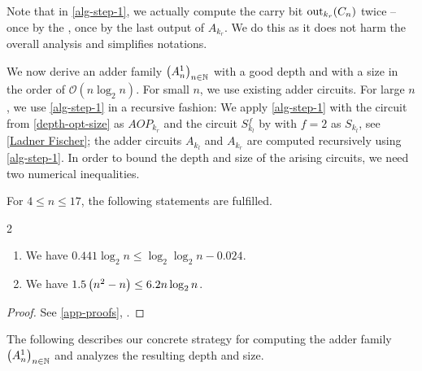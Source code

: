 Note that in \cref{alg-step-1},
we actually compute the carry bit $\operatorname{out}_{k_r}(C_n)$ twice --
once by the \aop{}, once by the last output of $A_{k_r}$.
We do this as it does not harm the overall analysis and simplifies notations.

We now derive an adder family $\left({A^{1}_n}\right)_{n \in \mathbb N}$ with a good depth and
with a size in the order of $\mathcal O(n \log_2 n)$.
For small $n$, we use existing adder circuits.
For large $n$, we use \cref{alg-step-1} in a recursive fashion:
We apply \cref{alg-step-1} with the \aop{} circuit from \cref{depth-opt-size}
as $AOP_{k_r}$ and the circuit $S\!^f_{k_l}$ by \citet{LF80} with $f = 2$
as $S\!_{k_l}$,
see \cref{Ladner Fischer};
the adder circuits $A_{k_l}$ and $A_{k_r}$ are computed recursively
using \cref{alg-step-1}.
In order to bound the depth and size of the arising circuits,
we need two numerical inequalities.
\parbox{\textwidth}{
\begin{lemma} \label{step1-num}
For $4 \leq n \leq 17$, the following statements are fulfilled.
\begin{multicols}{2}
\begin{enumerate}
\item We have $0.441 \log_2 n \leq \log_2 \log_2 n - 0.024$. \label{num-441}
\item We have $1.5 \left({n^2 - n}\right) \leq 6.2 n \log_2 n$. \label{num-sq}
\end{enumerate}
\end{multicols}
\end{lemma}
}
\begin{proof}
See \cref{app-proofs}, .
\end{proof}


The following  describes our concrete strategy
for computing the adder family $\left({A^1_n}\right)_{n \in \mathbb N}$ and
analyzes the resulting depth and size.

